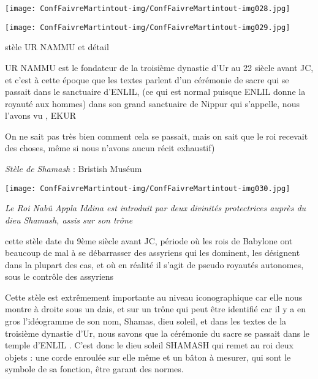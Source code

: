 \documentclass[a4paper]{article}
\begin{document}
\bigskip


\bigskip


\texttt{[image: ConfFaivreMartintout-img/ConfFaivreMartintout-img028.jpg]}

\texttt{[image: ConfFaivreMartintout-img/ConfFaivreMartintout-img029.jpg]}



\bigskip

{
stèle UR NAMMU et détail}


\bigskip


\bigskip

{
UR NAMMU est le fondateur de la troisième dynastie d'Ur au 22 siècle
avant JC, et c'est à cette époque que les textes parlent d'un cérémonie
de sacre qui se passait dans le sanctuaire d'ENLIL, (ce qui est normal
puisque ENLIL donne la royauté aux hommes) dans son grand sanctuaire de
Nippur qui s'appelle, nous l'avons vu , EKUR}

{
On ne sait pas très bien comment cela se passait, mais on sait que le
roi recevait des choses, même si nous n'avons aucun récit exhaustif)}


\bigskip


\bigskip

{
\textit{Stèle de Shamash} : Bristish Muséum}


\bigskip


\texttt{[image: ConfFaivreMartintout-img/ConfFaivreMartintout-img030.jpg]}



\bigskip

{
\textit{Le Roi Nabû Appla Iddina est introduit par deux divinités
protectrices auprès du dieu Shamash, assis sur son trône}}


\bigskip


\bigskip

{
cette stèle date du 9ème siècle avant JC, période où les rois de
Babylone ont beaucoup de mal à se débarrasser des assyriens qui les
dominent, les désignent dans la plupart des cas, et où en réalité il
s'agit de pseudo royautés autonomes, sous le contrôle des assyriens}


\bigskip


\bigskip

{
Cette stèle est extrêmement importante au niveau iconographique car elle
nous montre à droite sous un dais, et sur un trône qui peut être
identifié car il y a en gros l'idéogramme de son nom, Shamas, dieu
soleil, et dans les textes de la troisième dynastie d'Ur, nous savons
que la cérémonie du sacre se passait dans le temple d'ENLIL . C'est
donc le dieu soleil SHAMASH qui remet au roi deux objets : une corde
enroulée sur elle même et un bâton à mesurer, qui sont le symbole de sa
fonction, être garant des normes.}
\end{document}
